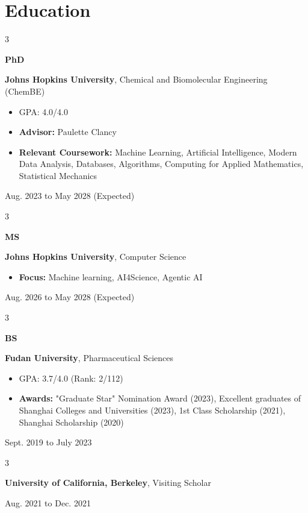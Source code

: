 \documentclass[10pt, letterpaper]{article}
\newenvironment{highlights}{
    \begin{itemize}[
        topsep=0.10 cm,
        parsep=0.10 cm,
        partopsep=0pt,
        itemsep=0pt,
        leftmargin=0.4 cm + 10pt
    ]
}{
    \end{itemize}
} %
\newenvironment{threecolentry}[3][]{
    \onecolentry
    \def\thirdColumn{#3}
    \setcolumnwidth{1 cm, \fill, 4.5 cm}
    \begin{paracol}{3}
    {\raggedright #2} \switchcolumn
}{
    \switchcolumn \raggedleft \thirdColumn
    \end{paracol}
    \endonecolentry
} %
\begin{document}
    \section{Education}

\begin{threecolentry}{\textbf{PhD}}{Aug. 2023 to May 2028 (Expected)}
    \textbf{Johns Hopkins University}, Chemical and Biomolecular Engineering (ChemBE)
    \begin{highlights}
        \item GPA: 4.0/4.0
        \item \textbf{Advisor:} Paulette Clancy
        \item \textbf{Relevant Coursework:} Machine Learning, Artificial Intelligence, Modern Data Analysis, Databases, Algorithms, Computing for Applied Mathematics, Statistical Mechanics
    \end{highlights}
\end{threecolentry}
\begin{threecolentry}{\textbf{MS}}{Aug. 2026 to May 2028 (Expected)}
    \textbf{Johns Hopkins University}, Computer Science
    \begin{highlights}
        \item \textbf{Focus:} Machine learning, AI4Science, Agentic AI
    \end{highlights}
\end{threecolentry}
\begin{threecolentry}{\textbf{BS}}{Sept. 2019 to July 2023}
    \textbf{Fudan University}, Pharmaceutical Sciences
    \begin{highlights}
        \item GPA: 3.7/4.0 (Rank: 2/112)
        \item \textbf{Awards:} "Graduate Star" Nomination Award (2023), Excellent graduates of Shanghai Colleges and Universities (2023), 1st Class Scholarship (2021), Shanghai Scholarship (2020)
    \end{highlights}
\end{threecolentry}

\begin{threecolentry}{\textbf{}}{Aug. 2021 to Dec. 2021}
    \textbf{University of California, Berkeley}, Visiting Scholar
\end{threecolentry}
\end{document}
